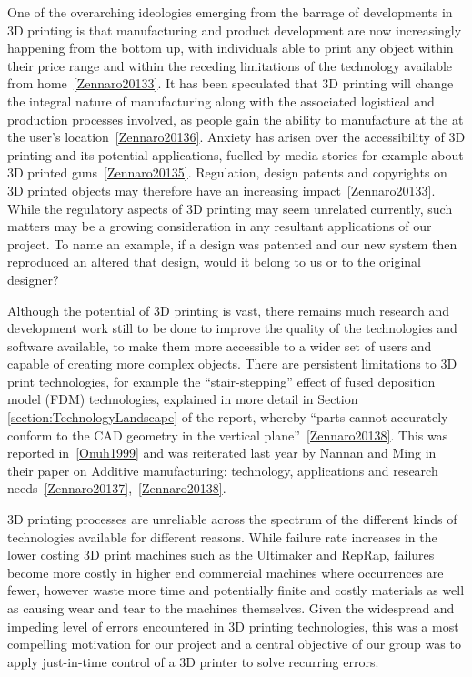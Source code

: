\documentclass[11pt]{report} %
\begin{document}
One of the overarching ideologies emerging from the barrage of developments in 3D printing is that manufacturing and product development are now increasingly happening from the bottom up, with individuals able to print any object within their price range and within the receding limitations of the technology available from home~\ref{Zennaro20133}. It has been speculated that 3D printing will change the integral nature of manufacturing along with the associated logistical and production processes involved, as people gain the ability to manufacture at the at the user's location~\ref{Zennaro20136}. Anxiety has arisen over the accessibility of 3D printing and its potential applications, fuelled by media stories for example about 3D printed guns~\ref{Zennaro20135}. Regulation, design patents and copyrights on 3D printed objects may therefore have an increasing impact~\ref{Zennaro20133}. While the regulatory aspects of 3D printing may seem unrelated currently, such matters may be a growing consideration in any resultant applications of our project. To name an example, if a design was patented and our new system then reproduced an altered that design, would it belong to us or to the original designer?

Although the potential of 3D printing is vast, there remains much research and development work still to be done to improve the quality of the technologies and software available, to make them more accessible to a wider set of users and capable of creating more complex objects. There are persistent limitations to 3D print technologies, for example the ``stair-stepping'' effect of fused deposition model (FDM) technologies, explained in more detail in Section \ref{section:TechnologyLandscape} of the report, whereby ``parts cannot accurately conform to the CAD geometry in the vertical plane''~\ref{Zennaro20138}. This was reported in~\ref{Onuh1999} and was reiterated last year by Nannan and Ming in their paper on Additive manufacturing: technology, applications and research needs~\ref{Zennaro20137},~\ref{Zennaro20138}.

3D printing processes are unreliable across the spectrum of the different kinds of technologies available for different reasons. While failure rate increases in the lower costing 3D print machines such as the Ultimaker and RepRap, failures become more costly in higher end commercial machines where occurrences are fewer, however waste more time and potentially finite and costly materials as well as causing wear and tear to the machines themselves. Given the widespread and impeding level of errors encountered in 3D printing technologies, this was a most compelling motivation for our project and a central objective of our group was to apply just-in-time control of a 3D printer to solve recurring errors. 
\end{document}
